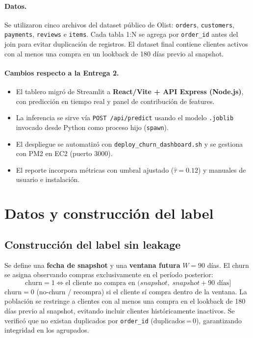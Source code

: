 \documentclass[11pt]{article}
\begin{document}
\paragraph{Datos.}
Se utilizaron cinco archivos del dataset público de Olist: \texttt{orders},
\texttt{customers}, \texttt{payments}, \texttt{reviews} e \texttt{items}. Cada
tabla 1:N se agrega por \texttt{order\_id} antes del join para evitar duplicación
de registros. El dataset final contiene clientes activos con al menos una compra
en un lookback de 180 días previo al snapshot.

\paragraph{Cambios respecto a la Entrega 2.}
\begin{itemize}[itemsep=1pt, topsep=2pt]
  \item El tablero migró de Streamlit a \textbf{React/Vite + API Express (Node.js)},
        con predicción en tiempo real y panel de contribución de features.
  \item La inferencia se sirve vía \texttt{POST /api/predict} usando el modelo
        \texttt{.joblib} invocado desde Python como proceso hijo (\texttt{spawn}).
  \item El despliegue se automatizó con \texttt{deploy\_churn\_dashboard.sh} y
        se gestiona con PM2 en EC2 (puerto 3000).
  \item El reporte incorpora métricas con umbral ajustado ($\hat{\tau}=0.12$) y
        manuales de usuario e instalación.
\end{itemize}

\section{Datos y construcción del label}

\subsection*{Construcción del label sin leakage}

Se define una \textbf{fecha de snapshot} y una \textbf{ventana futura} $W=90$
días. El churn se asigna observando compras exclusivamente en el período
posterior:
\[
  \text{churn}=1 \iff \text{el cliente no compra en }
  (\textit{snapshot},\; \textit{snapshot}+90\text{ días}]
\]
$\text{churn}=0$ (no-churn / recompra) si el cliente sí compra dentro de la
ventana. La población se restringe a clientes con al menos una compra en el
lookback de 180 días previo al snapshot, evitando incluir clientes
históricamente inactivos. Se verificó que no existan duplicados por
\texttt{order\_id} (duplicados\,=\,0), garantizando integridad en los agrupados.
\end{document}
